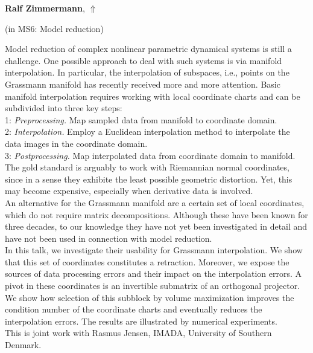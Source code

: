 \documentclass[ILAS2025-program.tex]{subfiles}
\begin{document}
\hypertarget{down0130}{}\begin{ilasabstract}
    
\textbf{Ralf Zimmermann},  \hfill \hyperlink{up0130}{$\Uparrow$}
    
    
(in {\color{mstitle}MS6: Model reduction})
        
\mtskip
    Model reduction of complex nonlinear parametric dynamical systems is still a challenge.
One possible approach to deal with such systems is via manifold interpolation. In particular, the interpolation of subspaces, i.e., points on the Grassmann manifold has recently received more and more attention.
Basic manifold interpolation requires working with local coordinate charts and can be subdivided into three key steps:\\
1: {\em Preprocessing.} Map sampled data from manifold  to  coordinate domain. \\
2: {\em Interpolation.}
	Employ a Euclidean interpolation method to interpolate the data images in the coordinate domain.\\
3: {\em Postprocessing.} Map interpolated data from coordinate domain to manifold.\\
The gold standard is arguably to work with Riemannian normal coordinates, since in a sense they exhibite the least possible geometric distortion.
Yet, this may become expensive, especially when derivative data is involved.\\
An alternative for the Grassmann manifold are a certain set of local coordinates, which do not require matrix decompositions. Although these have been known for three decades, to our knowledge they have not yet been investigated in detail and have not been used in connection with model reduction.\\
In this talk, we investigate their usability for Grassmann interpolation. We show that this set of coordinates constitutes a retraction. Moreover, we expose the sources of data processing errors and their impact on the interpolation errors. A pivot in these coordinates is an invertible submatrix of an orthogonal projector.
We show how selection of this subblock by volume maximization improves the condition number of the coordinate charts and eventually reduces the interpolation errors.
The results are illustrated by numerical experiments.
\\
%
This is joint work with Rasmus Jensen, IMADA, University of Southern Denmark. 

\end{ilasabstract}
    
\end{document}
